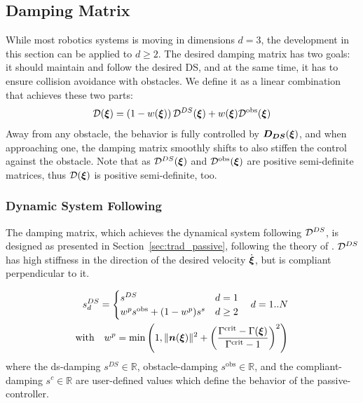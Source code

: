 \documentclass[conference]{IEEEtran}
\begin{document}
\subsection{Damping Matrix}
While most robotics systems is moving in dimensions $d = 3$, the development in this section can be applied to $d \geq 2$.
The desired damping matrix has two goals: it should maintain and follow the desired DS, and at the same time, it has to ensure collision avoidance with obstacles. We define it as a linear combination that achieves these two parts:
\begin{equation}
    \matd D(\vecs\xi) = \left(1 - w(\vecs\xi) \right) {\matd D^{DS}}(\vecs\xi) + w(\vecs\xi)  {\matd D^{\mathrm{obs}}}(\vecs\xi) \label{eq:damping_summation}
\end{equation}
Away from any obstacle, the behavior is fully controlled by $\boldsymbol{D_{DS}}(\boldsymbol{\xi})$, and when approaching one, the damping matrix smoothly shifts to also stiffen the control against the obstacle. 
Note that as ${\mathcal{D}^{DS}}(\boldsymbol{\xi})$ and $\mathcal{D^{\mathrm{obs}}}(\boldsymbol{\xi})$ are positive semi-definite matrices, thus $\mathcal{D}(\boldsymbol{\xi})$ is positive semi-definite, too.


\subsubsection{Dynamic System Following}
The damping matrix, which achieves the dynamical system following $\mathcal{D}^{DS}$, is designed as presented in Section~\ref{sec:trad_passive}, following the theory of \cite{kronander2015passive}. $\mathcal{D}^{DS}$ has high stiffness in the direction of the desired velocity $\dot{\boldsymbol{\xi}}$, but is compliant perpendicular to it.

\begin{equation}
  \begin{split}
  s_d^{DS} =
  \begin{cases}
    s^{DS} & d = 1 \\
    w^p s^{\mathrm{obs}} + (1- w^p) s^s & d \geq 2 
  \end{cases} \quad d = 1 .. N\\
  \text{with} \quad
   w^p = \min \left(1,  \| \boldsymbol{n}(\boldsymbol{\xi}) \|^2 + \left(\frac{\Gamma^{\mathrm{crit}} -\Gamma(\boldsymbol{\xi})}{\Gamma^{\mathrm{crit}} - 1}\right) ^2 \right)
  \end{split}
\end{equation}
where the ds-damping $s^{DS} \in \mathbb{R}$, obstacle-damping $s^{\mathrm{obs}} \in \mathbb{R}$, and the compliant-damping $s^c \in \mathbb{R}$ are user-defined values which define the behavior of the passive-controller.
\end{document}
